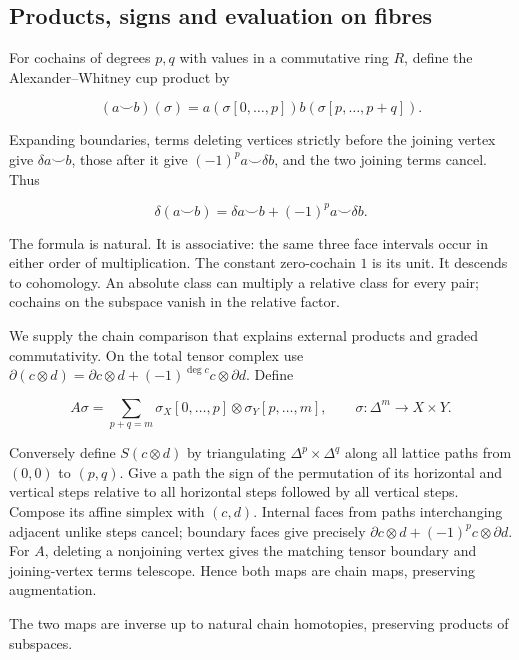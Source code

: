 \subsection{Products, signs and evaluation on fibres}
\label{mapsI:chain:section-4}

For cochains of degrees \(p,q\) with values in a commutative ring \(R\), define the Alexander--Whitney cup product by

\[
(a\smile b)(\sigma)=a(\sigma[0,\ldots,p])
b(\sigma[p,\ldots,p+q]).
\]

Expanding boundaries, terms deleting vertices strictly before the joining vertex give \(\delta a\smile b\), those after it give \((-1)^p a\smile\delta b\), and the two joining terms cancel. Thus

\[
\delta(a\smile b)=\delta a\smile b+(-1)^p a\smile\delta b.
\]

The formula is natural. It is associative: the same three face intervals occur in either order of multiplication. The constant zero-cochain \(1\) is its unit. It descends to cohomology. An absolute class can multiply a relative class for every pair; cochains on the subspace vanish in the relative factor.

We supply the chain comparison that explains external products and graded commutativity. On the total tensor complex use
\(\partial(c\otimes d)=\partial c\otimes d+(-1)^{\deg c}c\otimes\partial d\).
Define

\[
A\sigma=\sum_{p+q=m}\sigma_X[0,\ldots,p]\otimes\sigma_Y[p,\ldots,m],
\qquad \sigma:\Delta^m\to X\times Y.
\]

Conversely define \(S(c\otimes d)\) by triangulating \(\Delta^p\times\Delta^q\) along all lattice paths from \((0,0)\) to \((p,q)\). Give a path the sign of the permutation of its horizontal and vertical steps relative to all horizontal steps followed by all vertical steps. Compose its affine simplex with \((c,d)\). Internal faces from paths interchanging adjacent unlike steps cancel; boundary faces give precisely \(\partial c\otimes d+(-1)^p c\otimes\partial d\). For \(A\), deleting a nonjoining vertex gives the matching tensor boundary and joining-vertex terms telescope. Hence both maps are chain maps, preserving augmentation.

\begin{lemma}
\label{mapsI:chain:lemma:4.1}
\leavevmode\par
The two maps are inverse up to natural chain homotopies, preserving products of subspaces.
\end{lemma}


